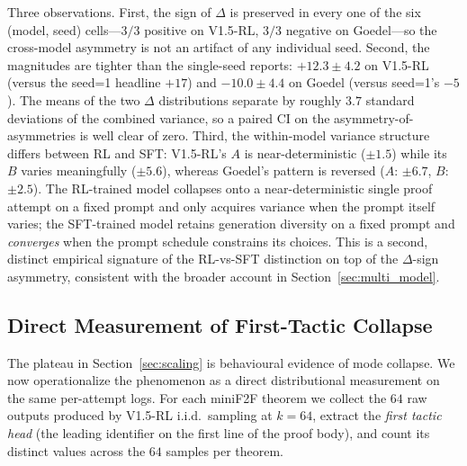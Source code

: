 \documentclass{article}
\begin{document}
Three observations. First, the sign of $\Delta$ is preserved in every one of the six (model, seed) cells---$3/3$ positive on V1.5-RL, $3/3$ negative on Goedel---so the cross-model asymmetry is not an artifact of any individual seed. Second, the magnitudes are tighter than the single-seed reports: $+12.3 \pm 4.2$ on V1.5-RL (versus the seed=1 headline $+17$) and $-10.0 \pm 4.4$ on Goedel (versus seed=1's $-5$). The means of the two $\Delta$ distributions separate by roughly $3.7$ standard deviations of the combined variance, so a paired CI on the asymmetry-of-asymmetries is well clear of zero. Third, the within-model variance structure differs between RL and SFT: V1.5-RL's $A$ is near-deterministic ($\pm 1.5$) while its $B$ varies meaningfully ($\pm 5.6$), whereas Goedel's pattern is reversed ($A$: $\pm 6.7$, $B$: $\pm 2.5$). The RL-trained model collapses onto a near-deterministic single proof attempt on a fixed prompt and only acquires variance when the prompt itself varies; the SFT-trained model retains generation diversity on a fixed prompt and \emph{converges} when the prompt schedule constrains its choices. This is a second, distinct empirical signature of the RL-vs-SFT distinction on top of the $\Delta$-sign asymmetry, consistent with the broader account in Section~\ref{sec:multi_model}.

\subsection{Direct Measurement of First-Tactic Collapse}
\label{sec:first_tactic}

The plateau in Section~\ref{sec:scaling} is behavioural evidence of mode collapse. We now operationalize the phenomenon as a direct distributional measurement on the same per-attempt logs. For each miniF2F theorem we collect the $64$ raw outputs produced by V1.5-RL i.i.d.\ sampling at $k{=}64$, extract the \emph{first tactic head} (the leading identifier on the first line of the proof body), and count its distinct values across the $64$ samples per theorem.
\end{document}
